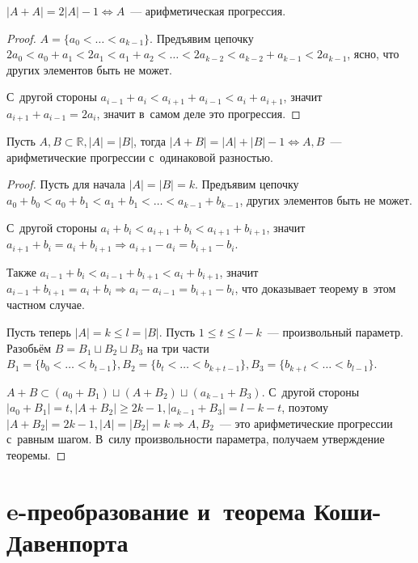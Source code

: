 \documentclass{article}
\begin{document}
\begin{theorem}
	$|A + A| = 2|A| - 1 \Leftrightarrow A$~--- арифметическая прогрессия.
\end{theorem}
\begin{proof}
	$A = \{ a_0 < \ldots < a_{k-1} \}$. Предъявим цепочку $2a_0 < a_0 + a_1 < 2a_1
	< a_1 + a_2 < \ldots < 2a_{k-2} < a_{k-2} + a_{k-1} < 2a_{k-1}$, ясно, что
	других элементов быть не может.

	С~другой стороны $a_{i-1} + a_i < a_{i+1} + a_{i-1} < a_i + a_{i+1}$, значит
	$a_{i+1} + a_{i-1} = 2a_i$, значит в~самом деле это прогрессия.
\end{proof}

\begin{theorem}
	Пусть $A, B \subset \mathbb{R}, |A| = |B|$, тогда $|A + B| = |A| + |B| -
	1 \Leftrightarrow A, B$~--- арифметические прогрессии с~одинаковой разностью.
\end{theorem}
\begin{proof}
	Пусть для начала $|A| = |B| = k$. Предъявим цепочку $a_0 + b_0 < a_0 + b_1 <
	a_1 + b_1 < \ldots < a_{k-1} + b_{k-1}$, других элементов быть не может.

	С~другой стороны $a_i + b_i < a_{i+1} + b_i < a_{i+1} + b_{i+1}$, значит
	$a_{i+1} + b_i = a_i + b_{i+1} \Rightarrow a_{i+1} - a_i = b_{i+1} - b_i$.

	Также $a_{i-1} + b_{i} < a_{i-1} + b_{i+1} < a_{i} + b_{i+1}$, значит $a_{i-1}
	+ b_{i+1} = a_{i} + b_{i} \Rightarrow a_i - a_{i-1} = b_{i+1} - b_{i}$, что
	доказывает теорему в~этом частном случае.

	Пусть теперь $|A| = k \le l = |B|$. Пусть $1 \le t \le l - k$~--- произвольный
	параметр. Разобьём $B = B_1 \sqcup B_2 \sqcup B_3$ на три части $B_1 = \{b_0 <
	\ldots < b_{t-1}\}, B_2 = \{b_t < \ldots < b_{k+t-1}\}, B_3 = \{b_{k+t} <
	\ldots < b_{l-1}\}$.

	$A + B \subset (a_0 + B_1) \sqcup (A + B_2) \sqcup (a_{k-1} + B_3)$. С~другой
	стороны $|a_0 + B_1| = t, |A + B_2| \ge 2k - 1, |a_{k-1} + B_3| = l - k - t$,
	поэтому $|A + B_2| = 2k - 1, |A| = |B_2| = k \Rightarrow A, B_2$~--- это
	арифметические прогрессии с~равным шагом. В~силу произвольности параметра,
	получаем утверждение теоремы.
\end{proof}

\section{e-преобразование и~теорема Коши-Давенпорта}
\end{document}
